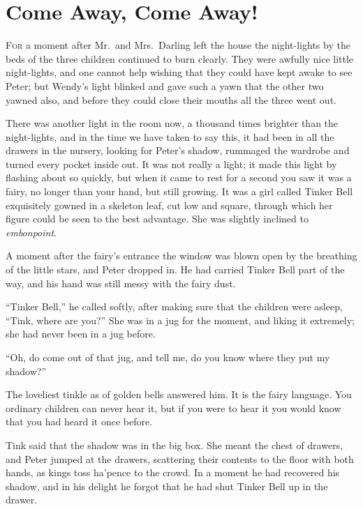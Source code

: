 \chapter{Come Away, Come Away!}

\lettrine{F}{or} a moment after Mr.\ and Mrs.\ Darling left the house the
night-lights by the beds of the three children continued to burn clearly. They
were awfully nice little night-lights, and one cannot help wishing that they
could have kept awake to see Peter; but Wendy's light blinked and gave such a
yawn that the other two yawned also, and before they could close their mouths
all the three went out.

There was another light in the room now, a thousand times brighter than the
night-lights, and in the time we have taken to say this, it had been in all the
drawers in the nursery, looking for Peter's shadow, rummaged the wardrobe and
turned every pocket inside out. It was not really a light; it made this light by
flashing about so quickly, but when it came to rest for a second you saw it was
a fairy, no longer than your hand, but still growing. It was a girl called
Tinker Bell exquisitely gowned in a skeleton leaf, cut low and square, through
which her figure could be seen to the best advantage. She was slightly inclined
to \emph{embonpoint}.

A moment after the fairy's entrance the window was blown open by the breathing
of the little stars, and Peter dropped in. He had carried Tinker Bell part of
the way, and his hand was still messy with the fairy dust.

``Tinker Bell,'' he called softly, after making sure that the children were
asleep, ``Tink, where are you?'' She was in a jug for the moment, and liking it
extremely; she had never been in a jug before.

``Oh, do come out of that jug, and tell me, do you know where they put my
shadow?''

The loveliest tinkle as of golden bells answered him. It is the fairy language.
You ordinary children can never hear it, but if you were to hear it you would
know that you had heard it once before.

Tink said that the shadow was in the big box. She meant the chest of drawers,
and Peter jumped at the drawers, scattering their contents to the floor with
both hands, as kings toss ha'pence to the crowd. In a moment he had recovered
his shadow, and in his delight he forgot that he had shut Tinker Bell up in the
drawer.

